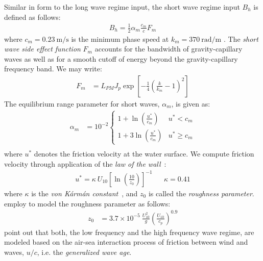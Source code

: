 Similar in form to the long wave regime input, the short wave regime input $B_h$
is defined as follows:
\begin{align*}
 B_h = \frac{1}{2}\alpha_m\frac{c_m}{c}F_m
\end{align*}
where ${c_m=\SI{0.23}{\meter\per\second}}$ is the minimum phase speed at
\wavenumber ${k_m=\SI{370}{\radian\per\meter}}$ \citep{lamb:1945}.
The \emph{short wave side effect function} $F_m$ accounts for the bandwidth of
gravity-capillary waves as well as for a smooth cutoff of energy beyond the
gravity-capillary frequency band. We may write:
\begin{align*}
 F_m &= L_{PM}J_p\exp\left[- 
\frac{1}{4}\left(\frac{k}{k_m} - 1\right)^2\right]
\end{align*}
The equilibrium range parameter for short waves, $\alpha_m$, is given as:
\begin{align*}
 \alpha_m &= 10^{-2}\begin{cases}
	1 + \ln\left(\frac{u^{\ast}}{c_m}\right) & u^{\ast} < c_m \\
	1 + 3\ln\left(\frac{u^{\ast}}{c_m}\right) & u^{\ast} \geq c_m
	\end{cases} \\
\end{align*}
where $u^{\ast}$ denotes the friction velocity at the water surface.
We compute friction velocity through application of the
\emph{law of the wall}~\citep{article:vonKarman1931}:
%
\begin{align*}
u^{\ast} = \kappa~U_{10} \left[\ln\left(\frac{10}{z_0}\right)\right]^{-1} && \kappa = 0.41
\end{align*}
where $\kappa$ is the \emph{von K\'arm\'an constant}~\citep{article:vonKarman1931},
and $z_0$ is called the \emph{roughness parameter}.
\citeauthor{article:Elfouhaily1997} employ \citet{article:Donelan1993} to model
the roughness parameter as follows:
\begin{align*}
z_0 &= 3.7 \times 10^{-5}~\frac{U_{10}^2}{g}
\left(\frac{U_{10}}{c_p}\right)^{0.9} \label{eq:z_0}
\end{align*}
%
\citeauthor{article:Elfouhaily1997} point out that both, the low frequency
and the high frequency wave regime, are modeled based on the air-sea
interaction process of friction between wind and
waves, $u/c$, i.e. the \emph{generalized wave age}.
%
%

